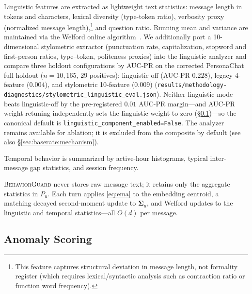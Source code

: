 \documentclass[conference]{IEEEtran}
\newcommand{\BG}{\textsc{BehaviorGuard}}
\newcommand{\Pu}{P_u}
\begin{document}
Linguistic features are extracted as lightweight text statistics: message length in
tokens and characters, lexical diversity (type-token ratio), verbosity proxy
(normalized message length),\footnote{This feature captures structural deviation in
message length, not formality register (which requires lexical/syntactic analysis
such as contraction ratio or function word frequency).} and question ratio.
Running mean and variance are maintained via the Welford online algorithm~\cite{welford1962note}.
We additionally port a 10-dimensional stylometric extractor (punctuation rate,
capitalization, stopword and first-person ratios, type--token, politeness proxies)
into the linguistic analyzer and compare three holdout configurations by AUC-PR on
the corrected PersonaChat full holdout ($n{=}10{,}165$, 29 positives):
linguistic off (AUC-PR $0.228$), legacy 4-feature ($0.004$), and stylometric
10-feature ($0.009$) (\texttt{results/methodology-diagnostics/stylometric\_linguistic\_eval.json}).
Neither linguistic mode beats linguistic-off by the pre-registered $0.01$ AUC-PR
margin---and AUC-PR weight retuning independently sets the linguistic weight to zero
(\S\ref{sec:scoring})---so the canonical default is
\texttt{linguistic\_component\_enabled=False}.
The analyzer remains available for ablation; it is excluded from the composite by
default (see also \S\ref{sec:baserate:mechanism}).

Temporal behavior is summarized by active-hour histograms, typical inter-message gap
statistics, and session frequency.

\BG{} never stores raw message text; it retains only the aggregate statistics in $\Pu$.
Each turn applies \eqref{eq:ema} to the embedding centroid, a matching decayed
second-moment update to $\boldsymbol{\Sigma}_u$, and Welford updates to the linguistic
and temporal statistics---all $O(d)$ per message.

\subsection{Anomaly Scoring}
\label{sec:scoring}
\end{document}
